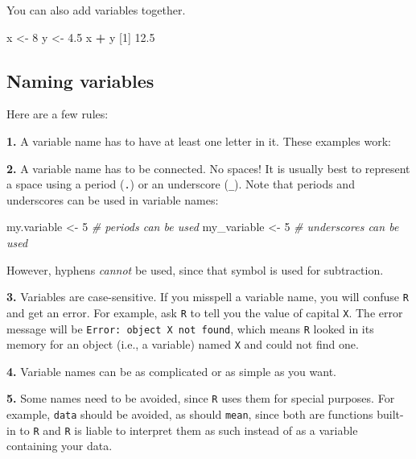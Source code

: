 \documentclass[]{book}
\newenvironment{Shaded}{\begin{snugshade}}{\end{snugshade}}
\newcommand{\CommentTok}[1]{\textcolor[rgb]{0.56,0.35,0.01}{\textit{#1}}}
\newcommand{\DecValTok}[1]{\textcolor[rgb]{0.00,0.00,0.81}{#1}}
\newcommand{\FloatTok}[1]{\textcolor[rgb]{0.00,0.00,0.81}{#1}}
\newcommand{\NormalTok}[1]{#1}
\newcommand{\OperatorTok}[1]{\textcolor[rgb]{0.81,0.36,0.00}{\textbf{#1}}}
\newcommand{\StringTok}[1]{\textcolor[rgb]{0.31,0.60,0.02}{#1}}
\begin{document}
You can also add variables together.

\begin{Shaded}
\begin{Highlighting}[]
\NormalTok{x <-}\StringTok{ }\DecValTok{8}
\NormalTok{y <-}\StringTok{ }\FloatTok{4.5}
\NormalTok{x }\OperatorTok{+}\StringTok{ }\NormalTok{y}
\NormalTok{[}\DecValTok{1}\NormalTok{] }\FloatTok{12.5}
\end{Highlighting}
\end{Shaded}

\hypertarget{naming-variables}{%
\subsection*{Naming variables}\label{naming-variables}}

Here are a few rules:

\textbf{1.} A variable name has to have at least one letter in it. These examples work:

\textbf{2.} A variable name has to be connected. No spaces! It is usually best to represent a space using a period (\texttt{.}) or an underscore (\texttt{\_}). Note that periods and underscores can be used in variable names:

\begin{Shaded}
\begin{Highlighting}[]
\NormalTok{my.variable <-}\StringTok{ }\DecValTok{5} \CommentTok{# periods can be used}
\NormalTok{my_variable <-}\StringTok{ }\DecValTok{5} \CommentTok{# underscores can be used}
\end{Highlighting}
\end{Shaded}

However, hyphens \emph{cannot} be used, since that symbol is used for subtraction.

\textbf{3.} Variables are case-sensitive. If you misspell a variable name, you will confuse \texttt{R} and get an error. For example, ask \texttt{R} to tell you the value of capital \texttt{X}. The error message will be \texttt{Error:\ object\ \textquotesingle{}X\textquotesingle{}\ not\ found}, which means \texttt{R} looked in its memory for an object (i.e., a variable) named \texttt{X} and could not find one.

\textbf{4.} Variable names can be as complicated or as simple as you want.

\textbf{5.} Some names need to be avoided, since \texttt{R} uses them for special purposes. For example, \texttt{data} should be avoided, as should \texttt{mean}, since both are functions built-in to \texttt{R} and \texttt{R} is liable to interpret them as such instead of as a variable containing your data.
\end{document}
